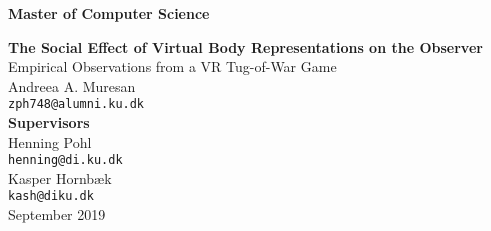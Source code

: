 \documentclass[12pt,a4paper,oneside]{article}
\begin{document}
\raggedbottom
    \thispagestyle{empty}
 
    \vspace*{-1cm}
    \begin{center}
        \textbf{\Large Master of Computer Science} \\
    \end{center}
    \vspace*{5cm} 
    \begin{center}
    \textbf{\Huge The Social Effect of Virtual Body Representations on the
Observer} \\
    \vspace*{1cm} 
    {\Large Empirical Observations from a VR Tug-of-War Game} \\
      \vspace*{1cm} 
    Andreea A. Muresan \\
    \texttt{zph748@alumni.ku.dk} \\
     \vspace*{1cm} 
    \textbf{\large Supervisors} \\
         \vspace*{0.2cm} 
    Henning Pohl  \\
    \texttt{henning@di.ku.dk} \\
         \vspace*{0.2cm} 
    Kasper Hornbæk \\
    \texttt{kash@diku.dk} \\
       \vspace*{1cm} 
   September 2019
   
 \end{center}
\newpage
\ClearWallPaper

\tableofcontents
{}
\newpage
\ClearWallPaper












\medskip



\end{document}
